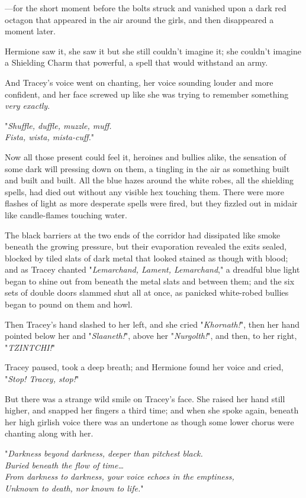 ---for the short moment before the bolts struck and vanished upon a dark red 
octagon that appeared in the air around the girls, and then disappeared a 
moment later.

Hermione saw it, she saw it but she still couldn't imagine it; she couldn't 
imagine a Shielding Charm that powerful, a spell that would withstand an army.

And Tracey's voice went on chanting, her voice sounding louder and more 
confident, and her face screwed up like she was trying to remember something 
\emph{very exactly}.

"\emph{Shuffle, duffle, muzzle, muff.\\
Fista, wista, mista-cuff.}"

Now all those present could feel it, heroines and bullies alike, the sensation 
of some dark will pressing down on them, a tingling in the air as something 
built and built and built. All the blue hazes around the white robes, all the 
shielding spells, had died out without any visible hex touching them. There 
were more flashes of light as more desperate spells were fired, but they 
fizzled out in midair like candle-flames touching water.

The black barriers at the two ends of the corridor had dissipated like smoke 
beneath the growing pressure, but their evaporation revealed the exits sealed, 
blocked by tiled slats of dark metal that looked stained as though with blood; 
and as Tracey chanted "\emph{Lemarchand, Lament, Lemarchand}," a dreadful blue 
light began to shine out from beneath the metal slats and between them; and the 
six sets of double doors slammed shut all at once, as panicked white-robed 
bullies began to pound on them and howl.

Then Tracey's hand slashed to her left, and she cried "\emph{Khornath!}", then 
her hand pointed below her and "\emph{Slaaneth!}", above her 
"\emph{Nurgolth!}", and then, to her right, "\emph{TZINTCHI!}"

Tracey paused, took a deep breath; and Hermione found her voice and cried, 
"\emph{Stop! Tracey, stop!}"

But there was a strange wild smile on Tracey's face. She raised her hand still 
higher, and snapped her fingers a third time; and when she spoke again, beneath 
her high girlish voice there was an undertone as though some lower chorus were 
chanting along with her.

"\emph{Darkness beyond darkness, deeper than pitchest black.\\
Buried beneath the flow of time{\ldots}\\
From darkness to darkness, your voice echoes in the emptiness,\\
Unknown to death, nor known to life.}"

